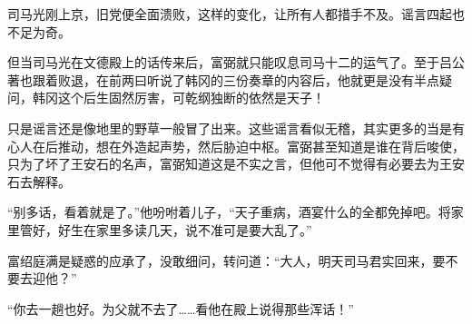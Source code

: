 司马光刚上京，旧党便全面溃败，这样的变化，让所有人都措手不及。谣言四起也不足为奇。

但当司马光在文德殿上的话传来后，富弼就只能叹息司马十二的运气了。至于吕公著也跟着败退，在前两曰听说了韩冈的三份奏章的内容后，他就更是没有半点疑问，韩冈这个后生固然厉害，可乾纲独断的依然是天子！

只是谣言还是像地里的野草一般冒了出来。这些谣言看似无稽，其实更多的当是有心人在后推动，想在外造起声势，然后胁迫中枢。富弼甚至知道是谁在背后唆使，只为了坏了王安石的名声，富弼知道这是不实之言，但他可不觉得有必要去为王安石去解释。

“别多话，看着就是了。”他吩咐着儿子，“天子重病，酒宴什么的全都免掉吧。将家里管好，好生在家里多读几天，说不准可是要大乱了。”

富绍庭满是疑惑的应承了，没敢细问，转问道：“大人，明天司马君实回来，要不要去迎他？”

“你去一趟也好。为父就不去了……看他在殿上说得那些浑话！”


